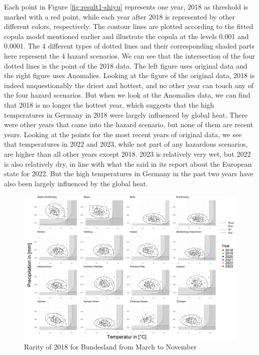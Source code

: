 \documentclass[
]{krantz}
\begin{document}
Each point in Figure \ref{fig:result1-shiyu} represents one year, 2018 as threshold is marked with a red point, while each year after 2018 is represented by other different colors, respectively. The contour lines are plotted according to the fitted copula model mentioned earlier and illustrate the copula at the levels 0.001 and 0.0001. The 4 different types of dotted lines and their corresponding shaded parts here represent the 4 hazard scenarios. We can see that the intersection of the four dotted lines is the point of the 2018 data. The left figure uses original data and the right figure uses Anomalies.
Looking at the figure of the original data, 2018 is indeed unquestionably the driest and hottest, and no other year can touch any of the four hazard scenarios. But when we look at the Anomalies data, we can find that 2018 is no longer the hottest year, which suggests that the high temperatures in Germany in 2018 were largely influenced by global heat. There were other years that came into the hazard scenario, but none of them are recent years.
Looking at the points for the most recent years of original data, we see that temperatures in 2022 and 2023, while not part of any hazardous scenarios, are higher than all other years except 2018. 2023 is relatively very wet, but 2022 is also relatively dry, in line with what the \citet{wmo2023b} said in its report about the European state for 2022. But the high temperatures in Germany in the past two years have also been largely influenced by the global heat.

\begin{figure}

{\centering \includegraphics[width=0.8\linewidth]{work/03-compounds/figures/RESULTS/resultMtoN} 

}

\caption{Rarity of 2018 for Bundesland from March to November}\label{fig:result2-shiyu}
\end{figure}
\end{document}
